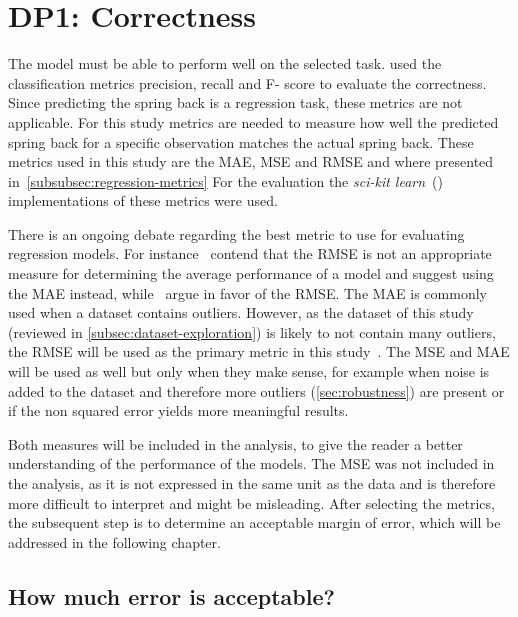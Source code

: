 \section{DP1: Correctness}\label{sec:dp1:-correctness}

The model must be able to perform well on the selected task.
\cite{siebert2022construction} used the classification metrics precision, recall and F- score to evaluate the
correctness.
Since predicting the spring back is a regression task, these metrics are not applicable.
For this study metrics are needed to measure how well the predicted spring back for a specific observation
matches the actual spring back.
These metrics used in this study are the MAE, MSE and RMSE and where presented in~\cref{subsubsec:regression-metrics}
For the evaluation the \textit{sci-kit learn}~(\cite{scikit-learn}) implementations of these metrics were used.

There is an ongoing debate regarding the best metric to use for evaluating regression models.
For instance~\cite{willmott2005advantages} contend that the RMSE is not an appropriate measure for determining the
average performance of a model and suggest using the MAE instead, while~\cite{chai2014root} argue in favor of the RMSE.
The MAE is commonly used when a dataset contains outliers.
However, as the dataset of this study (reviewed in \cref{subsec:dataset-exploration}) is likely to not contain many
outliers, the
RMSE will be used as the primary metric in this study~\cite[p. 1249]{chai2014root}.
The MSE and MAE will be used as well but only when they make sense, for example when noise is added to the dataset
and therefore more outliers (\cref{sec:robustness}) are present or if the non squared error yields more meaningful
results.

Both measures will be included in the analysis, to give the reader a better understanding of the performance of
the models.
The MSE was not included in the analysis, as it is not expressed in the same unit as the data and is therefore
more difficult to interpret and might be misleading.
After selecting the metrics, the subsequent step is to determine an acceptable margin of error, which will be
addressed in the following chapter.

\subsection*{How much error is acceptable?}\label{subsec:how-much-error-is-acceptable}

